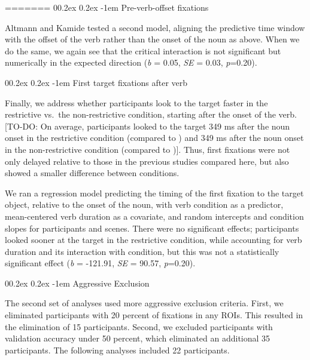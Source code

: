 \documentclass[
  man,floatsintext]{apa6}
\makeatletter
\let\oldparagraph\paragraph
\renewcommand{\paragraph}[1]{\oldparagraph{#1}\mbox{}}
\renewcommand{\paragraph}{\@startsection{paragraph}{4}{\parindent}%
  {0\baselineskip \@plus 0.2ex \@minus 0.2ex}%
  {-1em}%
  {\normalfont\normalsize\bfseries\itshape\typesectitle}}
\makeatother
\begin{document}
=======
\paragraph{Pre-verb-offset fixations}\label{pre-verb-offset-fixations}

Altmann and Kamide tested a second model, aligning the predictive time window with the offset of the verb rather than the onset of the noun as above. When we do the same, we again see that the critical interaction is not significant but numerically in the expected direction (\emph{b} = 0.05, \emph{SE} = 0.03, \emph{p}=0.20).

\paragraph{First target fixations after verb}\label{first-target-fixations-after-verb}

Finally, we address whether participants look to the target faster in the restrictive vs.~the non-restrictive condition, starting after the onset of the verb. {[}TO-DO: On average, participants looked to the target 349 ms after the noun onset in the restrictive condition (compared to ) and 349 ms after the noun onset in the non-restrictive condition (compared to ){]}. Thus, first fixations were not only delayed relative to those in the previous studies compared here, but also showed a smaller difference between conditions.

We ran a regression model predicting the timing of the first fixation to the target object, relative to the onset of the noun, with verb condition as a predictor, mean-centered verb duration as a covariate, and random intercepts and condition slopes for participants and scenes. There were no significant effects; participants looked sooner at the target in the restrictive condition, while accounting for verb duration and its interaction with condition, but this was not a statistically significant effect (\emph{b} = -121.91, \emph{SE} = 90.57, \emph{p}=0.20).

\paragraph{Aggressive Exclusion}\label{aggressive-exclusion}

The second set of analyses used more aggressive exclusion criteria. First, we eliminated participants with 20 percent of fixations in any ROIs. This resulted in the elimination of 15 participants. Second, we excluded participants with validation accuracy under 50 percent, which eliminated an additional 35 participants. The following analyses included 22 participants.
\end{document}
